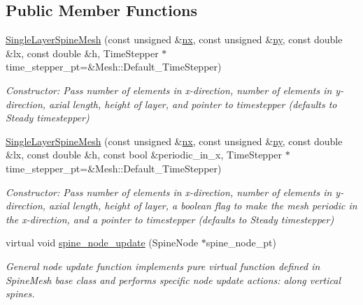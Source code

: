 \subsection*{Public Member Functions}
\begin{DoxyCompactItemize}
\item 
\hyperlink{classoomph_1_1SingleLayerSpineMesh_a2cdbf36114a4da773fb7d659218d09cb}{Single\+Layer\+Spine\+Mesh} (const unsigned \&\hyperlink{classoomph_1_1RectangularQuadMesh_abfef93d6322886cdce14a437186e4821}{nx}, const unsigned \&\hyperlink{classoomph_1_1RectangularQuadMesh_a86d76a55eb7c4e8bca9b74d23c8b0412}{ny}, const double \&lx, const double \&h, Time\+Stepper $\ast$time\+\_\+stepper\+\_\+pt=\&Mesh\+::\+Default\+\_\+\+Time\+Stepper)
\begin{DoxyCompactList}\small\item\em Constructor\+: Pass number of elements in x-\/direction, number of elements in y-\/direction, axial length, height of layer, and pointer to timestepper (defaults to Steady timestepper) \end{DoxyCompactList}\item 
\hyperlink{classoomph_1_1SingleLayerSpineMesh_afb908e31d988eaa930e949a54eeea37f}{Single\+Layer\+Spine\+Mesh} (const unsigned \&\hyperlink{classoomph_1_1RectangularQuadMesh_abfef93d6322886cdce14a437186e4821}{nx}, const unsigned \&\hyperlink{classoomph_1_1RectangularQuadMesh_a86d76a55eb7c4e8bca9b74d23c8b0412}{ny}, const double \&lx, const double \&h, const bool \&periodic\+\_\+in\+\_\+x, Time\+Stepper $\ast$time\+\_\+stepper\+\_\+pt=\&Mesh\+::\+Default\+\_\+\+Time\+Stepper)
\begin{DoxyCompactList}\small\item\em Constructor\+: Pass number of elements in x-\/direction, number of elements in y-\/direction, axial length, height of layer, a boolean flag to make the mesh periodic in the x-\/direction, and a pointer to timestepper (defaults to Steady timestepper) \end{DoxyCompactList}\item 
virtual void \hyperlink{classoomph_1_1SingleLayerSpineMesh_a364648c15ab29c0c8d1cf7c2bc4cb792}{spine\+\_\+node\+\_\+update} (Spine\+Node $\ast$spine\+\_\+node\+\_\+pt)
\begin{DoxyCompactList}\small\item\em General node update function implements pure virtual function defined in Spine\+Mesh base class and performs specific node update actions\+: along vertical spines. \end{DoxyCompactList}\end{DoxyCompactItemize}
